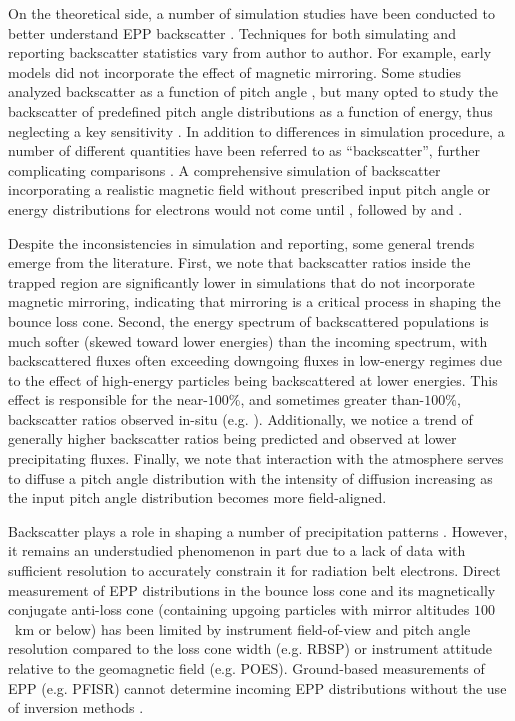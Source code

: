 \documentclass[draft]{agujournal2019}
\begin{document}
On the theoretical side, a number of simulation studies have been conducted to better understand EPP backscatter \cite{maeda1965, cummings1966, walt1968, banks1970, banks1974, berger1974, mantas1976, davidson1977, lejeune1979, cotts2011, marshall2018, berland2023}. Techniques for both simulating and reporting backscatter statistics vary from author to author. For example, early models \cite{maeda1965, berger1974} did not incorporate the effect of magnetic mirroring. Some studies analyzed backscatter as a function of pitch angle \cite{berger1974, cotts2011, marshall2018, berland2023}, but many opted to study the backscatter of predefined pitch angle distributions as a function of energy, thus neglecting a key sensitivity \cite{maeda1965, cummings1966, walt1968, banks1970, banks1974, mantas1976, solomon2001}. In addition to differences in simulation procedure, a number of different quantities have been referred to as ``backscatter'', further complicating comparisons \cite{mantas1976}. A comprehensive simulation of backscatter incorporating a realistic magnetic field without prescribed input pitch angle or energy distributions for electrons would not come until , followed by  and .

Despite the inconsistencies in simulation and reporting, some general trends emerge from the literature. First, we note that backscatter ratios inside the trapped region are significantly lower in simulations that do not incorporate magnetic mirroring, indicating that mirroring is a critical process in shaping the bounce loss cone. Second, the energy spectrum of backscattered populations is much softer (skewed toward lower energies) than the incoming spectrum, with backscattered fluxes often exceeding downgoing fluxes in low-energy regimes due to the effect of high-energy particles being backscattered at lower energies. This effect is responsible for the near-$100\%$, and sometimes greater than-$100\%$, backscatter ratios observed in-situ (e.g. ). Additionally, we notice a trend of generally higher backscatter ratios being predicted and observed at lower precipitating fluxes. Finally, we note that interaction with the atmosphere serves to diffuse a pitch angle distribution with the intensity of diffusion increasing as the input pitch angle distribution becomes more field-aligned.

Backscatter plays a role in shaping a number of precipitation patterns \cite{wetzel2024, khazanov2021, cotts2011, davidson1977}. However, it remains an understudied phenomenon in part due to a lack of data with sufficient resolution to accurately constrain it for radiation belt electrons. Direct measurement of EPP distributions in the bounce loss cone and its magnetically conjugate anti-loss cone (containing upgoing particles with mirror altitudes $100$~km or below) has been limited by instrument field-of-view and pitch angle resolution compared to the loss cone width (e.g. RBSP) or instrument attitude relative to the geomagnetic field (e.g. POES). Ground-based measurements of EPP (e.g. PFISR) cannot determine incoming EPP distributions without the use of inversion methods \cite{juarez2023, sanchez2022, turunen2016, miyoshi2015}. 
\end{document}
